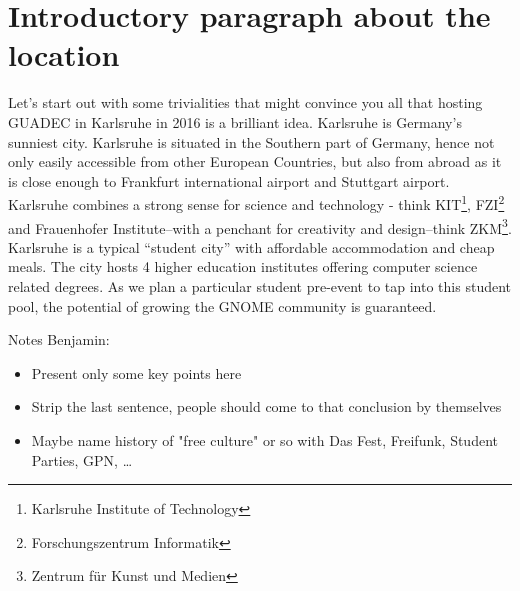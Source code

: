 \section{Introductory paragraph about the location}

Let's start out with some trivialities that might convince you all that 
hosting GUADEC in Karlsruhe in 2016 is a brilliant idea. Karlsruhe is 
Germany's sunniest city. Karlsruhe is situated in the Southern part of 
Germany, hence not only easily accessible from other European 
Countries, but also from abroad as it is close enough to Frankfurt 
international airport and Stuttgart airport. Karlsruhe combines a 
strong sense for science and technology - think KIT\footnote{Karlsruhe 
Institute of Technology}, FZI\footnote{Forschungszentrum Informatik} 
and Frauenhofer Institute–with a penchant for creativity and 
design–think ZKM\footnote{Zentrum für Kunst und Medien}. Karlsruhe is a 
typical “student city” with affordable accommodation and cheap meals. 
The city hosts 4 higher education institutes offering computer science 
related degrees. As we plan a particular student pre-event to tap into 
this student pool, the potential of growing the GNOME community is 
guaranteed.





Notes Benjamin:
\begin{itemize}
  \item Present only some key points here
  
  \item Strip the last sentence, people should come to that conclusion 
        by themselves
  
  \item Maybe name history of "free culture" or so with Das Fest, 
        Freifunk, Student Parties, GPN, …

\end{itemize}

